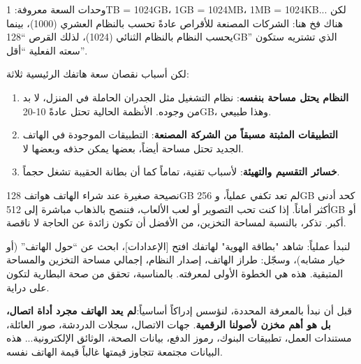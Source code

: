 وحدات السعة معروفة: 1TB = 1024GB، 1GB = 1024MB، 1MB = 1024KB... لكن هناك فخ هنا: الشركات المصنعة للأقراص عادةً تحسب بالنظام العشري (1000)، بينما يحسب النظام بالنظام الثنائي (1024)، لذلك القرص “128GB” الذي تشتريه ستكون سعته الفعلية “أقل”.

لكن أسباب نقصان سعة هاتفك الرئيسية ثلاثة:

\begin{enumerate}
  \item \textbf{النظام يحتل مساحة بنفسه}: نظام التشغيل مثل الجدران الحاملة في المنزل، لا بد من وجوده. الأنظمة الحالية تحتل عادةً 10-20GB، وهذا طبيعي.
  \item \textbf{التطبيقات المثبتة مسبقاً من الشركة المصنعة}: التطبيقات الموجودة في الهاتف الجديد تحتل مساحة أيضاً، بعضها يمكن حذفه وبعضها لا.
  \item \textbf{خسائر التقسيم والتهيئة}: لأسباب تقنية، تماماً كما أن بطانة الحقيبة تشغل حجماً.
\end{enumerate}

\begin{tcbinfo}{نصيحة صغيرة عند شراء الهاتف}
هواتف 128GB لم تعد تكفي عملياً، و 256GB كحد أدنى أكثر أماناً. إذا كنت تحب التصوير أو لعب الألعاب، فننصح بالذهاب مباشرة إلى 512GB أو أكبر. تذكر، بالنسبة لمساحة التخزين، من الأفضل أن تكون زائدة عن الحاجة لا ناقصة.

\end{tcbinfo}

\begin{tcbpractice}{لنبدأ عملياً: شاهد "بطاقة الهوية" لهاتفك}
افتح [الإعدادات]، ابحث عن “حول الهاتف” (أو خيار مشابه)، وسجّل: طراز الهاتف، إصدار النظام، إجمالي مساحة التخزين والمساحة المتبقية. هذه هي الخطوة الأولى لمعرفته. بالمناسبة، تحقق من صحة البطارية لتكون على دراية.

\end{tcbpractice}


قبل أن نبدأ بالمعرفة المحددة، لنؤسس إدراكاً أساسياً:\textbf{لم يعد الهاتف مجرد أداة اتصال، بل هو أهم مخزن لأصولنا الرقمية}. جهات الاتصال، سجلات الدردشة، صور العائلة، مستندات العمل، تطبيقات البنوك، رموز الدفع، بيانات الصحة، الوثائق الإلكترونية... هذه البيانات مجتمعة تتجاوز قيمتها غالباً قيمة الهاتف نفسه.

